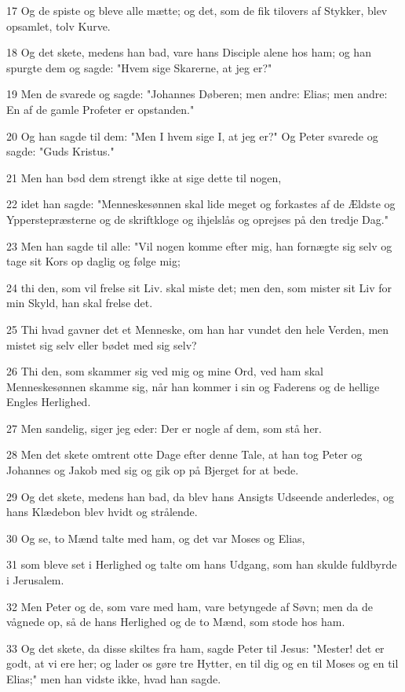 \par 17 Og de spiste og bleve alle mætte; og det, som de fik tilovers af Stykker, blev opsamlet, tolv Kurve.
\par 18 Og det skete, medens han bad, vare hans Disciple alene hos ham; og han spurgte dem og sagde: "Hvem sige Skarerne, at jeg er?"
\par 19 Men de svarede og sagde: "Johannes Døberen; men andre: Elias; men andre: En af de gamle Profeter er opstanden."
\par 20 Og han sagde til dem: "Men I hvem sige I, at jeg er?" Og Peter svarede og sagde: "Guds Kristus."
\par 21 Men han bød dem strengt ikke at sige dette til nogen,
\par 22 idet han sagde: "Menneskesønnen skal lide meget og forkastes af de Ældste og Ypperstepræsterne og de skriftkloge og ihjelslås og oprejses på den tredje Dag."
\par 23 Men han sagde til alle: "Vil nogen komme efter mig, han fornægte sig selv og tage sit Kors op daglig og følge mig;
\par 24 thi den, som vil frelse sit Liv. skal miste det; men den, som mister sit Liv for min Skyld, han skal frelse det.
\par 25 Thi hvad gavner det et Menneske, om han har vundet den hele Verden, men mistet sig selv eller bødet med sig selv?
\par 26 Thi den, som skammer sig ved mig og mine Ord, ved ham skal Menneskesønnen skamme sig, når han kommer i sin og Faderens og de hellige Engles Herlighed.
\par 27 Men sandelig, siger jeg eder: Der er nogle af dem, som stå her.
\par 28 Men det skete omtrent otte Dage efter denne Tale, at han tog Peter og Johannes og Jakob med sig og gik op på Bjerget for at bede.
\par 29 Og det skete, medens han bad, da blev hans Ansigts Udseende anderledes, og hans Klædebon blev hvidt og strålende.
\par 30 Og se, to Mænd talte med ham, og det var Moses og Elias,
\par 31 som bleve set i Herlighed og talte om hans Udgang, som han skulde fuldbyrde i Jerusalem.
\par 32 Men Peter og de, som vare med ham, vare betyngede af Søvn; men da de vågnede op, så de hans Herlighed og de to Mænd, som stode hos ham.
\par 33 Og det skete, da disse skiltes fra ham, sagde Peter til Jesus: "Mester! det er godt, at vi ere her; og lader os gøre tre Hytter, en til dig og en til Moses og en til Elias;" men han vidste ikke, hvad han sagde.
